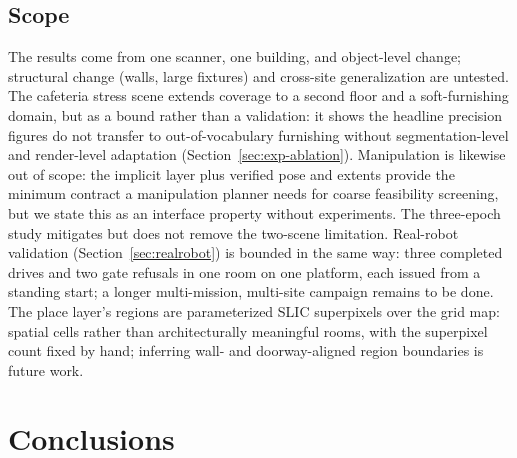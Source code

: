 \documentclass[electronics,article,accept,pdftex,moreauthors]{Definitions/mdpi}
\begin{document}
\subsection{Scope}
The results come from one scanner, one building, and object-level change;
structural change (walls, large fixtures) and cross-site generalization are
untested. The cafeteria stress scene extends coverage to a second floor
and a soft-furnishing domain, but as a bound rather than a validation: it
shows the headline precision figures do not transfer to
out-of-vocabulary furnishing without segmentation-level and
render-level adaptation (Section~\ref{sec:exp-ablation}). Manipulation is likewise out of scope: the implicit layer plus
verified pose and extents provide the minimum contract a manipulation
planner needs for coarse feasibility screening, but we state this as an
interface property without experiments. The three-epoch study mitigates but does not remove the two-scene
limitation. Real-robot validation (Section~\ref{sec:realrobot}) is bounded
in the same way: three completed drives and two gate refusals in one
room on one platform, each issued from a standing start; a longer
multi-mission, multi-site campaign remains to be done. The place layer's regions are parameterized SLIC superpixels over the grid
map: spatial cells rather than architecturally meaningful rooms, with the
superpixel count fixed by hand; inferring wall- and doorway-aligned region
boundaries is future work.


\section{Conclusions}
\label{sec:conclusion}
\end{document}
